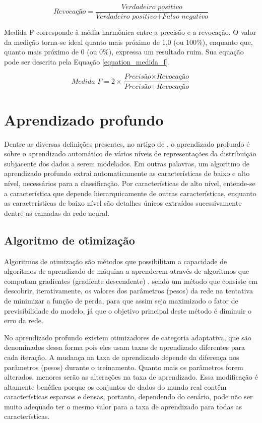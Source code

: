 \documentclass[
	12pt,				%
	oneside,			%
	a4paper,			%
	english,			%
	brazil				%
	]{abntex2ppgsi}
\begin{document}
\begin{equation}
  \textit{Revocação}=\frac{\textit{Verdadeiro positivo}}{\textit{Verdadeiro positivo} + \textit{Falso negativo}}
  \label{equation_revocacao}
\end{equation}

Medida F corresponde à média harmônica entre a precisão e a revocação. O valor da medição torna-se ideal quanto mais próximo de 1,0 (ou 100\%), enquanto que, quanto mais próximo de 0 (ou 0\%), expressa um resultado ruim. Sua equação pode ser descrita pela Equação \ref{equation_medida_f}.

\begin{equation}
  \textit{Medida F}=2 \times \frac{\textit{Precisão} \times \textit{Revocação}}{\textit{Precisão}+\textit{Revocação}}
  \label{equation_medida_f}
\end{equation}

\section{Aprendizado profundo}
Dentre as diversas definições presentes, no artigo de , o aprendizado profundo é sobre o aprendizado automático de vários níveis de representações da distribuição subjacente dos dados a serem modelados. Em outras palavras, um algoritmo de aprendizado profundo extrai automaticamente as características de baixo e alto nível, necessários para a classificação. Por características de alto nível, entende-se a característica que depende hierarquicamente de outras características, enquanto as características de baixo nível são detalhes únicos extraídos sucessivamente dentre as camadas da rede neural.

\subsection{Algoritmo de otimização}
Algoritmos de otimização são métodos que possibilitam a capacidade de algoritmos de aprendizado de máquina a aprenderem através de algoritmos que computam gradientes (gradiente descendente) \cite{zaheer2019study}, sendo um método que consiste em descobrir, iterativamente, os valores dos parâmetros (pesos) da rede na tentativa de minimizar a função de perda, para que assim seja maximizado o fator de previsibilidade do modelo, já que o objetivo principal deste método é diminuir o erro da rede.

No aprendizado profundo existem otimizadores de categoria adaptativa, que são denominados dessa forma pois eles usam taxas de aprendizado diferentes para cada iteração. A mudança na taxa de aprendizado depende da diferença nos parâmetros (pesos) durante o treinamento. Quanto mais os parâmetros forem alterados, menores serão as alterações na taxa de aprendizado. Essa modificação é altamente benéfica porque os conjuntos de dados do mundo real contêm características esparsas e densas, portanto, dependendo do cenário, pode não ser muito adequado ter o mesmo valor para a taxa de aprendizado para todas as características.
\end{document}
